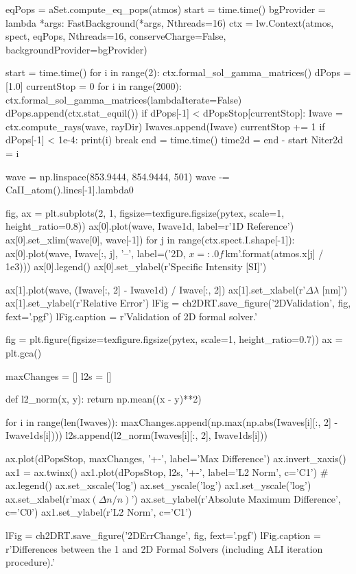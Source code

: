 \begin{pycode}[2DValidation]
eqPops = aSet.compute_eq_pops(atmos)
start = time.time()
bgProvider = lambda *args: FastBackground(*args, Nthreads=16)
ctx = lw.Context(atmos, spect, eqPops, Nthreads=16, conserveCharge=False, backgroundProvider=bgProvider)

start = time.time()
for i in range(2):
    ctx.formal_sol_gamma_matrices()
dPops = [1.0]
currentStop = 0
for i in range(2000):
    ctx.formal_sol_gamma_matrices(lambdaIterate=False)
    dPops.append(ctx.stat_equil())
    if dPops[-1] < dPopsStop[currentStop]:
        Iwave = ctx.compute_rays(wave, rayDir)
        Iwaves.append(Iwave)
        currentStop += 1
    if dPops[-1] < 1e-4:
        print(i)
        break
end = time.time()
time2d = end - start
Niter2d = i

wave = np.linspace(853.9444, 854.9444, 501)
wave -= CaII_atom().lines[-1].lambda0
\end{pycode}

\begin{pycode}[2DValidation]
fig, ax = plt.subplots(2, 1, figsize=texfigure.figsize(pytex, scale=1, height_ratio=0.8))
ax[0].plot(wave, Iwave1d, label=r'1D Reference')
ax[0].set_xlim(wave[0], wave[-1])
for j in range(ctx.spect.I.shape[-1]):
    ax[0].plot(wave, Iwave[:, j], '--', label=('2D, $x={:.0f}$\,\si{{\kilo\metre}}'.format(atmos.x[j] / 1e3)))
ax[0].legend()
ax[0].set_ylabel(r'Specific Intensity [SI]')

ax[1].plot(wave, (Iwave[:, 2] - Iwave1d) / Iwave[:, 2])
ax[1].set_xlabel(r'$\Delta\lambda$ [\si{\nano\metre}]')
ax[1].set_ylabel(r'Relative Error')
lFig = ch2DRT.save_figure('2DValidation', fig, fext='.pgf')
lFig.caption = r'Validation of 2D formal solver.'
\end{pycode}

\begin{pycode}[2DValidation]
fig = plt.figure(figsize=texfigure.figsize(pytex, scale=1, height_ratio=0.7))
ax = plt.gca()

maxChanges = []
l2s = []

def l2_norm(x, y):
    return np.mean((x - y)**2)

for i in range(len(Iwaves)):
    maxChanges.append(np.max(np.abs(Iwaves[i][:, 2] - Iwave1ds[i])))
    l2s.append(l2_norm(Iwaves[i][:, 2], Iwave1ds[i]))

ax.plot(dPopsStop, maxChanges, '+-', label='Max Difference')
ax.invert_xaxis()
ax1 = ax.twinx()
ax1.plot(dPopsStop, l2s, '+-', label='L2 Norm', c='C1')
# ax.legend()
ax.set_xscale('log')
ax.set_yscale('log')
ax1.set_yscale('log')
ax.set_xlabel(r'$\mathrm{max}(\Delta n / n)$')
ax.set_ylabel(r'Absolute Maximum Difference', c='C0')
ax1.set_ylabel(r'L2 Norm', c='C1')

lFig = ch2DRT.save_figure('2DErrChange', fig, fext='.pgf')
lFig.caption = r'Differences between the 1 and 2D Formal Solvers (including ALI iteration procedure).'
\end{pycode}

